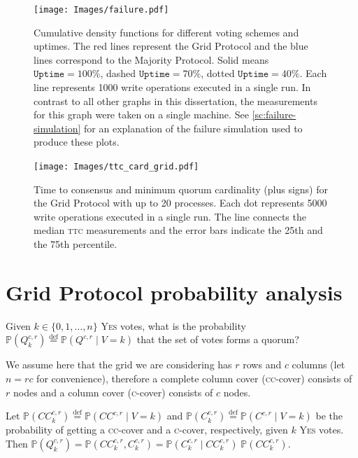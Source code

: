 \documentclass[12pt,chapterprefix=true,toc=bibliography,numbers=noendperiod,
               footnotes=multiple,twoside]{scrreprt}
\newcommand{\yes}{{\fontfamily{jkposn}\selectfont\textsc{Yes}}}
\begin{document}
    \begin{figure}[h]
        \centering
        \texttt{[image: Images/failure.pdf]}
        \caption{Cumulative density functions for different voting schemes and uptimes. The red lines represent the Grid Protocol and the blue lines correspond to the Majority Protocol. Solid means \(\texttt{Uptime} = 100\%\), dashed \(\texttt{Uptime} = 70\%\), dotted \(\texttt{Uptime} = 40\%\). Each line represents 1000 write operations executed in a single run. In contrast to all other graphs in this dissertation, the measurements for this graph were taken on a single machine. See \cref{sc:failure-simulation} for an explanation of the failure simulation used to produce these plots.}
        \label{fig:failure-ttc}
    \end{figure}
    \begin{figure}[h]
        \centering
        \texttt{[image: Images/ttc\_card\_grid.pdf]}
        \caption{Time to consensus and minimum quorum cardinality (plus signs) for the Grid Protocol with up to 20 processes. Each dot represents 5000 write operations executed in a single run. The line connects the median \textsc{ttc} measurements and the error bars indicate the 25th and the 75th percentile.}
        \label{fig:ttc_card_grid}
    \end{figure}

\chapter{Grid Protocol probability analysis}
\label{ch:grid-p}

Given \(k \in \{0, 1, \dots, n\}\) \yes{} votes, what is the probability \(\mathbb{P}(Q^{c,r}_k) \overset{\text{def}}{=} \mathbb{P}(Q^{c,r}\;|\;V=k)\) that the set of votes forms a quorum?

We assume here that the grid we are considering has \(r\) rows and \(c\) columns (let \(n = r c\) for convenience), therefore a complete column cover (\textsc{cc}-cover) consists of \(r\) nodes and a column cover (\textsc{c}-cover) consists of \(c\) nodes.

Let \(\mathbb{P}(CC^{c,r}_k) \overset{\text{def}}{=} \mathbb{P}(CC^{c,r}\;|\;V=k)\) and \(\mathbb{P}(C^{c,r}_k) \overset{\text{def}}{=} \mathbb{P}(C^{c,r}\;|\;V=k)\) be the probability of getting a \textsc{cc}-cover and a \textsc{c}-cover, respectively, given \(k\) \yes{} votes. Then \(\mathbb{P}(Q^{c,r}_k) = \mathbb{P}(CC^{c,r}_{k}, C^{c,r}_k) = \mathbb{P}(C^{c,r}_k\;|\;CC^{c,r}_k)\;\mathbb{P}(CC^{c,r}_k)\).
\end{document}
